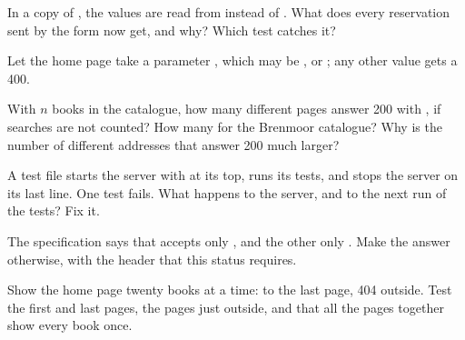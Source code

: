 \begin{exercise}[$\star\star$]\label{exo:g10:project-web-application:7}
In a copy of , the values are read from  instead of
. What does every reservation sent by the form now get, and why? Which test catches it?
\end{exercise}

\begin{exercise}[$\star\star$]\label{exo:g10:project-web-application:8}
Let the home page take a parameter , which may be ,  or ; any other
value gets a 400.
\end{exercise}

\begin{exercise}[$\star\star$]\label{exo:g10:project-web-application:9}
With $n$ books in the catalogue, how many different pages answer 200 with , if searches are not counted? How
many for the Brenmoor catalogue? Why is the number of different addresses that answer 200 much larger?
\end{exercise}

\begin{exercise}[$\star\star$]\label{exo:g10:project-web-application:10}
A test file starts the server with  at its top, runs its tests, and stops the server on its
last line. One test fails. What happens to the server, and to the next run of the tests? Fix it.
\end{exercise}

\begin{exercise}[$\star\star$]\label{exo:g10:project-web-application:11}
The specification says that  accepts only , and the other  only . Make the 
answer  otherwise, with the header that this status requires.
\end{exercise}

\begin{exercise}[$\star\star\star$]\label{exo:g10:project-web-application:12}
Show the home page twenty books at a time:  to the last page, 404 outside. Test the first and last
pages, the pages just outside, and that all the pages together show every book once.
\end{exercise}

